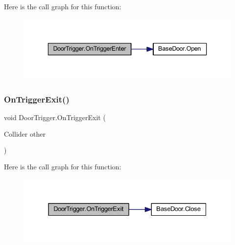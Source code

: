Here is the call graph for this function\+:
\nopagebreak
\begin{figure}[H]
\begin{center}
\leavevmode
\includegraphics[width=336pt]{class_door_trigger_a9cad842a8527ec462aae682c8c50b118_cgraph}
\end{center}
\end{figure}
\mbox{\label{class_door_trigger_adee54426b691466c5d667b912816bb56}} 
\subsubsection{\texorpdfstring{On\+Trigger\+Exit()}{OnTriggerExit()}}
{\footnotesize\ttfamily void Door\+Trigger.\+On\+Trigger\+Exit (\begin{DoxyParamCaption}\item[{Collider}]{other }\end{DoxyParamCaption})\hspace{0.3cm}{\ttfamily [private]}}

Here is the call graph for this function\+:
\nopagebreak
\begin{figure}[H]
\begin{center}
\leavevmode
\includegraphics[width=331pt]{class_door_trigger_adee54426b691466c5d667b912816bb56_cgraph}
\end{center}
\end{figure}
\mbox{\label{class_door_trigger_a3b079888a26feb3139b6a0507b89c65c}} 
